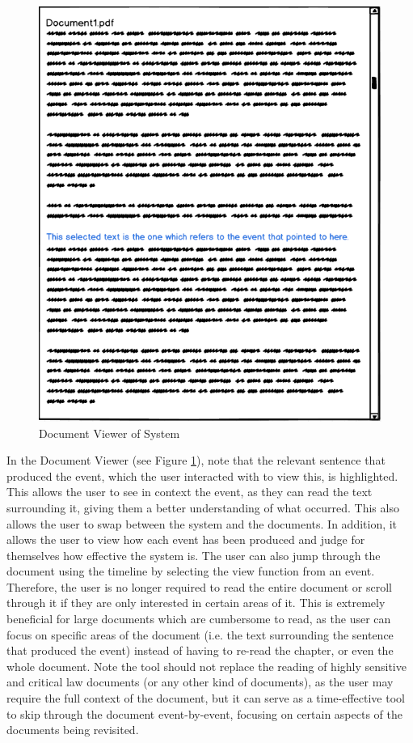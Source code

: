 \begin{figure}[h]
\caption{Document Viewer of System}
\label{fig:viewDoc}
\includegraphics[scale=0.75]{viewDoc.png}
\centering
\end{figure}
\par In the Document Viewer (see Figure \ref{fig:viewDoc}), note that the relevant sentence that produced the event, which the user interacted with to view this, is highlighted. This allows the user to see in context the event, as they can read the text surrounding it, giving them a better understanding of what occurred. This also allows the user to swap between the system and the documents. In addition, it allows the user to view how each event has been produced and judge for themselves how effective the system is. The user can also jump through the document using the timeline by selecting the view function from an event. Therefore, the user is no longer required to read the entire document or scroll through it if they are only interested in certain areas of it. This is extremely beneficial for large documents which are cumbersome to read, as the user can focus on specific areas of the document (i.e. the text surrounding the sentence that produced the event) instead of having to re-read the chapter, or even the whole document. Note the tool should not replace the reading of highly sensitive and critical law documents (or any other kind of documents), as the user may require the full context of the document, but it can serve as a time-effective tool to skip through the document event-by-event, focusing on certain aspects of the documents being revisited.











